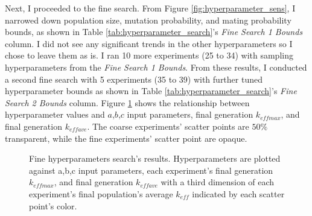 Next, I proceeded to the fine search. 
From Figure \ref{fig:hyperparameter_sens}, I narrowed down population size, 
mutation probability, and mating probability bounds, as shown in Table 
\ref{tab:hyperparameter_search}'s \textit{Fine Search 1 Bounds} column. 
I did not see any significant trends in the other hyperparameters so I chose 
to leave them as is. 
I ran 10 more experiments (25 to 34) with sampling hyperparameters from 
the \textit{Fine Search 1 Bounds}. 
From these results, I conducted a second fine search with 5 experiments 
(35 to 39) with further tuned hyperparameter bounds as shown in Table 
\ref{tab:hyperparameter_search}'s \textit{Fine Search 2 Bounds} column. 
Figure \ref{fig:input_hyperparameters_sens} shows the relationship between 
hyperparameter values and $a$,$b$,$c$ input parameters, final generation 
$k_{eff max}$, and final generation $k_{eff ave}$. 
The coarse experiments' scatter points are $50\%$ transparent, while the fine 
experiments' scatter point are opaque. 
\begin{figure}[]
    \centering
    \caption{Fine hyperparameters search's results. Hyperparameters are plotted 
    against a,b,c input parameters, each experiment's final generation
    $k_{eff max}$, and final generation $k_{eff ave}$ with a third dimension of 
    each experiment's final population's average $k_{eff}$ indicated by each 
    scatter point's color.}
    \label{fig:input_hyperparameters_sens}
\end{figure}

